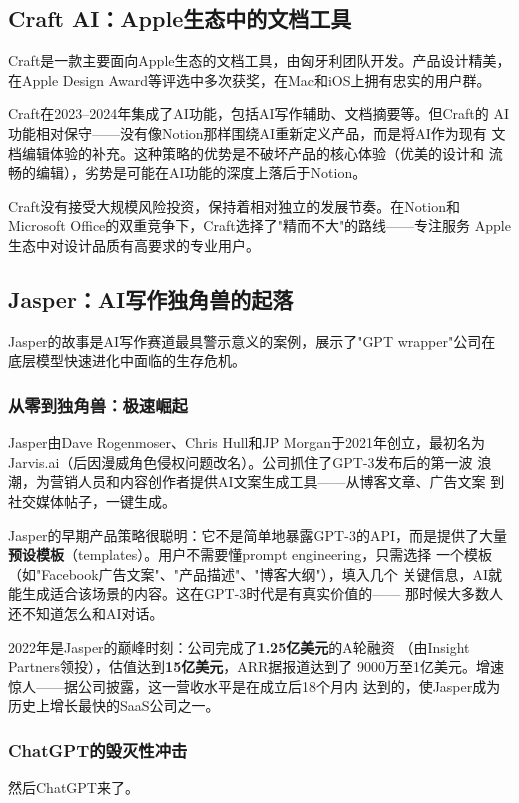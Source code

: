 \subsection{Craft AI：Apple生态中的文档工具}
\label{subsec:craft-ai}

Craft是一款主要面向Apple生态的文档工具，由匈牙利团队开发。产品设计精美，
在Apple Design Award等评选中多次获奖，在Mac和iOS上拥有忠实的用户群。

Craft在2023--2024年集成了AI功能，包括AI写作辅助、文档摘要等。但Craft的
AI功能相对保守——没有像Notion那样围绕AI重新定义产品，而是将AI作为现有
文档编辑体验的补充。这种策略的优势是不破坏产品的核心体验（优美的设计和
流畅的编辑），劣势是可能在AI功能的深度上落后于Notion。

Craft没有接受大规模风险投资，保持着相对独立的发展节奏。在Notion和
Microsoft Office的双重竞争下，Craft选择了"精而不大"的路线——专注服务
Apple生态中对设计品质有高要求的专业用户。

\subsection{Jasper：AI写作独角兽的起落}
\label{subsec:jasper}

Jasper的故事是AI写作赛道最具警示意义的案例，展示了"GPT wrapper"公司在
底层模型快速进化中面临的生存危机。

\subsubsection{从零到独角兽：极速崛起}
Jasper由Dave Rogenmoser、Chris Hull和JP Morgan于2021年创立，最初名为
Jarvis.ai（后因漫威角色侵权问题改名）。公司抓住了GPT-3发布后的第一波
浪潮，为营销人员和内容创作者提供AI文案生成工具——从博客文章、广告文案
到社交媒体帖子，一键生成。

Jasper的早期产品策略很聪明：它不是简单地暴露GPT-3的API，而是提供了大量
\textbf{预设模板}（templates）。用户不需要懂prompt engineering，只需选择
一个模板（如"Facebook广告文案"、"产品描述"、"博客大纲"），填入几个
关键信息，AI就能生成适合该场景的内容。这在GPT-3时代是有真实价值的——
那时候大多数人还不知道怎么和AI对话。

2022年是Jasper的巅峰时刻：公司完成了\textbf{1.25亿美元}的A轮融资
（由Insight Partners领投），估值达到\textbf{15亿美元}，ARR据报道达到了
9000万至1亿美元。增速惊人——据公司披露，这一营收水平是在成立后18个月内
达到的，使Jasper成为历史上增长最快的SaaS公司之一。

\subsubsection{ChatGPT的毁灭性冲击}
然后ChatGPT来了。

